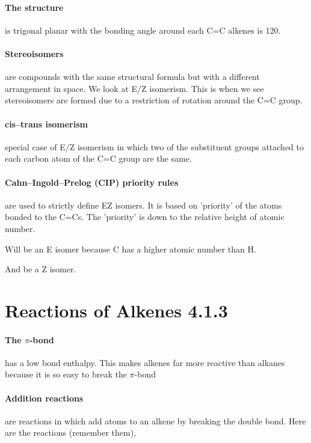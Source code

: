 	\paragraph{The structure} is trigonal planar with the bonding angle around each C=C alkenes is 120\degree .
	
	\paragraph{Stereoisomers} are compounds with the same structural formula but with a different arrangement in space. We look at E/Z isomerism. This is when we see stereoisomers are formed due to a restriction of rotation around the C=C group.
	
	\paragraph{cis–trans isomerism} special case of E/Z isomerism in which two of the substituent groups attached to each carbon atom of the C=C group are the same.
	
	\paragraph{Cahn–Ingold–Prelog (CIP) priority rules} are used to strictly define EZ isomers. It is based on 'priority' of the atoms bonded to the C=Cs. The 'priority' is down to the relative height of atomic number.
	\begin{center}
	\end{center}
	Will be an E isomer because C has a higher atomic number than H.
	\begin{center}
	\end{center}
	And be a Z isomer.
	
\section{Reactions of Alkenes 4.1.3}

	\paragraph{The $\pi$-bond} has a low bond enthalpy. This makes alkenes far more reactive than alkanes because it is so easy to break the $\pi$-bond
	
	\paragraph{Addition reactions} are reactions in which add atoms to an alkene by breaking the double bond. Here are the reactions (remember them),
	
